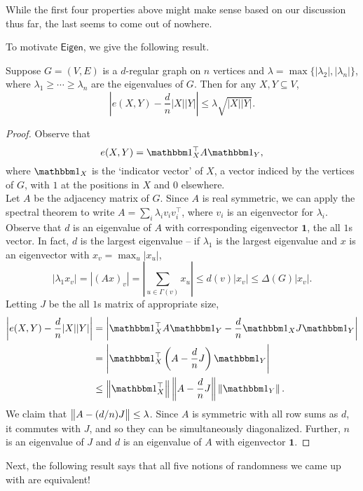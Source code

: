 			While the first four properties above might make sense based on our discussion thus far, the last seems to come out of nowhere.

			To motivate $\mathsf{Eigen}$, we give the following result.

			\begin{ftheo}
				\label{theo: expander mixing lemma}
				Suppose $G=(V,E)$ is a $d$-regular graph on $n$ vertices and $\lambda = \max\{|\lambda_2|,|\lambda_n|\}$, where $\lambda_1 \ge \cdots \ge \lambda_n$ are the eigenvalues of $G$. Then for any $X,Y\subseteq V$,
				\[ \left| e(X,Y) - \frac{d}{n}|X||Y| \right| \le \lambda\sqrt{|X||Y|}. \]
			\end{ftheo}
			\begin{proof}
				Observe that
				\[ e(X,Y) = \indic_X^\top A \indic_Y, \]
				where $\indic_X$ is the `indicator vector' of $X$, a vector indiced by the vertices of $G$, with $1$ at the positions in $X$ and $0$ elsewhere.\\
				Let $A$ be the adjacency matrix of $G$. Since $A$ is real symmetric, we can apply the spectral theorem to write $A = \sum_i \lambda_i v_i v_i^\top$, where $v_i$ is an eigenvector for $\lambda_i$.\\
				Observe that $d$ is an eigenvalue of $A$ with corresponding eigenvector $\mathbf{1}$, the all $1$s vector. In fact, $d$ is the largest eigenvalue -- if $\lambda_1$ is the largest eigenvalue and $x$ is an eigenvector with $x_v = \max_u |x_u|$,
				\[ |\lambda_1 x_v| = |(Ax)_v| = \left|\sum_{u \in \Gamma(v)} x_u \right| \le d(v) |x_v| \le \Delta(G) |x_v|. \]
				Letting $J$  be the all $1$s matrix of appropriate size,
				\begin{align*}
					\left| e(X,Y) - \frac{d}{n}|X||Y| \right| &= \left| \indic_X^\top A \indic_Y - \frac{d}{n} \indic_X J \indic_Y \right| \\
						&= \left| \indic_X^\top \left( A - \frac{d}{n} J \right) \indic_Y \right| \\
						&\le \norm{\indic_X^\top} \norm{A - \frac{d}{n} J} \norm{\indic_Y}.
				\end{align*}
				We claim that $\left\lVert A - (d/n)J\right\rVert \le \lambda$. Since $A$ is symmetric with all row sums as $d$, it commutes with $J$, and so they can be simultaneously diagonalized. Further, $n$ is an eigenvalue of $J$ and $d$ is an eigenvalue of $A$ with eigenvector $\mathbf{1}$.
			\end{proof}

			Next, the following result says that all five notions of randomness we came up with are equivalent!

